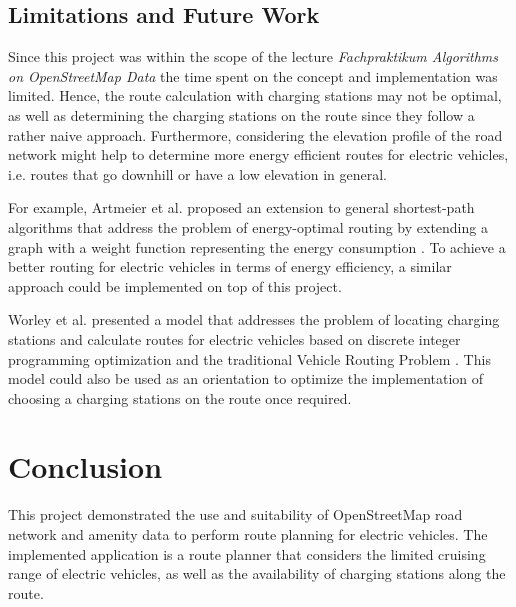 \documentclass[a4paper]{article}
\begin{document}
\subsection{Limitations and Future Work}
Since this project was within the scope of the lecture \textit{Fachpraktikum Algorithms on OpenStreetMap Data} the time spent on the concept and implementation was limited.
Hence, the route calculation with charging stations may not be optimal, as well as determining the charging stations on the route since they follow a rather naive approach.
Furthermore, considering the elevation profile of the road network might help to determine more energy efficient routes for electric vehicles, i.e. routes that go downhill or have a low elevation in general.\par\medskip
For example, Artmeier et al. \cite{Artmeier2010} proposed an extension to general shortest-path algorithms that address the problem of energy-optimal routing by extending a graph with a weight function representing the energy consumption \cite{Artmeier2010}.
To achieve a better routing for electric vehicles in terms of energy efficiency, a similar approach could be implemented on top of this project.\par\medskip
Worley et al. \cite{Worley2012} presented a model that addresses the problem of locating charging stations and calculate routes for electric vehicles based on discrete integer programming optimization and the traditional Vehicle Routing Problem \cite{Worley2012}.
This model could also be used as an orientation to optimize the implementation of choosing a charging stations on the route once required.
\section{Conclusion}
This project demonstrated the use and suitability of OpenStreetMap road network and amenity data to perform route planning for electric vehicles.
The implemented application is a route planner that considers the limited cruising range of electric vehicles, as well as the availability of charging stations along the route.


\end{document}
